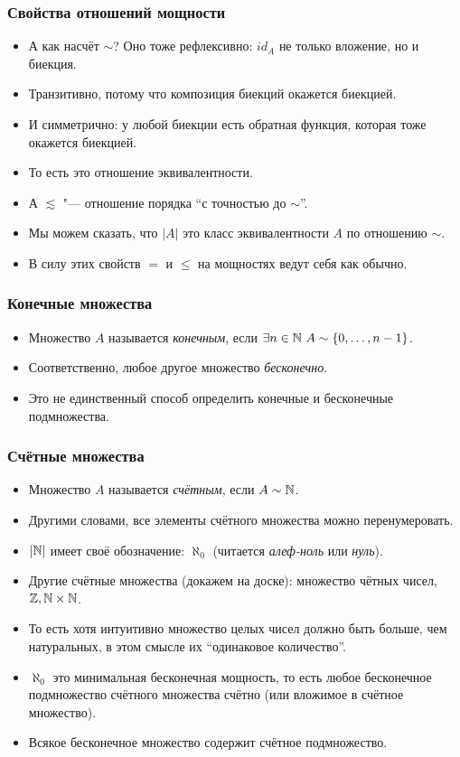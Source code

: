 \documentclass[10pt]{beamer}
\begin{document}
\begin{frame}
    \frametitle{Свойства отношений мощности}
    \begin{itemize}
        \item А как насчёт $\sim$? Оно тоже рефлексивно: $id_A$ не только вложение, но и \pause биекция.
        \pause
        \item Транзитивно, потому что \pause композиция биекций окажется биекцией.
        \pause
        \item И симметрично: у любой биекции есть \pause обратная функция, которая тоже окажется биекцией.
        \pause
        \item То есть это отношение \pause эквивалентности.
        \item А $\lesssim$ "--- отношение порядка \enquote{с точностью до $\sim$}.
        \pause
        \item Мы можем сказать, что $|A|$ это класс эквивалентности $A$ по отношению $\sim$.
        \item В силу этих свойств $=$ и $\leq$ на мощностях ведут себя как обычно.
    \end{itemize}
\end{frame}

\begin{frame}
    \frametitle{Конечные множества}
    \begin{itemize}
        \item Множество $A$ называется \emph{конечным}, если $\exists n \in \mathbb{N}~A \sim \{0,\dots,n-1\}$.
        \item Соответственно, любое другое множество \emph{бесконечно}.
        \item Это не единственный способ определить конечные и бесконечные подмножества.
    \end{itemize}
\end{frame}

\begin{frame}
    \frametitle{Счётные множества}
    \begin{itemize}
        \item Множество $A$ называется \emph{счётным}, если $A \sim \mathbb{N}$.
        \item Другими словами, все элементы счётного множества можно перенумеровать.
        \item $|\mathbb{N}|$ имеет своё обозначение: $\aleph_0$ (читается \emph{алеф-ноль} или \emph{нуль}).
        \item Другие счётные множества (докажем на доске): множество чётных чисел, $\mathbb{Z}, \mathbb{N} \times \mathbb{N}$.
        \pause
        \item То есть хотя интуитивно множество целых чисел должно быть больше, чем натуральных, в этом смысле их \enquote{одинаковое количество}.
        \pause
        \item $\aleph_0$ это минимальная бесконечная мощность, то есть любое бесконечное подмножество счётного множества счётно (или вложимое в счётное множество).
        \pause
        \item Всякое бесконечное множество содержит счётное подмножество.
    \end{itemize}
\end{frame}
\end{document}
